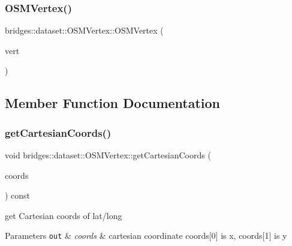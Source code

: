 \subsubsection{\texorpdfstring{O\+S\+M\+Vertex()}{OSMVertex()}\hspace{0.1cm}{\footnotesize\ttfamily [3/3]}}
{\footnotesize\ttfamily bridges\+::dataset\+::\+O\+S\+M\+Vertex\+::\+O\+S\+M\+Vertex (\begin{DoxyParamCaption}\item[{const \mbox{\hyperlink{classbridges_1_1dataset_1_1_o_s_m_vertex}{O\+S\+M\+Vertex}} $\ast$}]{vert }\end{DoxyParamCaption})\hspace{0.3cm}{\ttfamily [inline]}}



\subsection{Member Function Documentation}
\mbox{\label{classbridges_1_1dataset_1_1_o_s_m_vertex_a0151ea438e8265b184a91c9591aa8a12}} 
\subsubsection{\texorpdfstring{get\+Cartesian\+Coords()}{getCartesianCoords()}}
{\footnotesize\ttfamily void bridges\+::dataset\+::\+O\+S\+M\+Vertex\+::get\+Cartesian\+Coords (\begin{DoxyParamCaption}\item[{double $\ast$}]{coords }\end{DoxyParamCaption}) const\hspace{0.3cm}{\ttfamily [inline]}}

get Cartesian coords of lat/long


\begin{DoxyParams}[1]{Parameters}
\mbox{\tt out}  & {\em coords} & cartesian coordinate coords\mbox{[}0\mbox{]} is x, coords\mbox{[}1\mbox{]} is y \\
\hline
\end{DoxyParams}
\mbox{\label{classbridges_1_1dataset_1_1_o_s_m_vertex_a1f41a5f01d68747ee04b5c5eaa629c6e}} 
